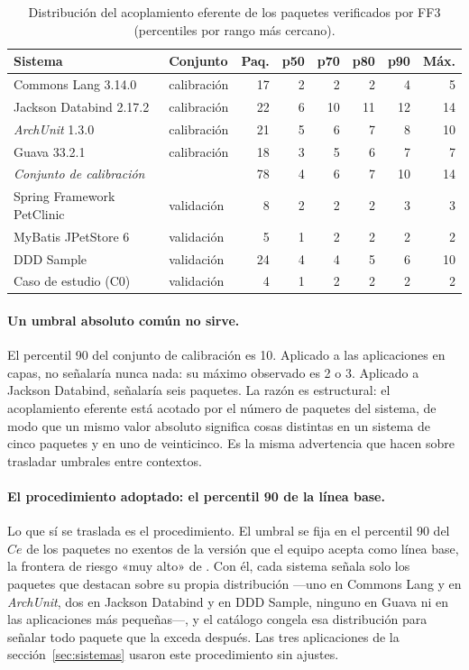 \begin{table}[H]
\centering
\caption{Distribución del acoplamiento eferente de los paquetes verificados por FF3 (percentiles por rango más cercano).}
\label{tab:umbral}
\footnotesize
\begin{tabular}{llrrrrrr}
\toprule
\textbf{Sistema} & \textbf{Conjunto} & \textbf{Paq.} & \textbf{p50} & \textbf{p70} & \textbf{p80} & \textbf{p90} & \textbf{Máx.} \\
\midrule
Commons Lang 3.14.0 & calibración & 17 & 2 & 2 & 2 & 4 & 5 \\
Jackson Databind 2.17.2 & calibración & 22 & 6 & 10 & 11 & 12 & 14 \\
\textit{ArchUnit} 1.3.0 & calibración & 21 & 5 & 6 & 7 & 8 & 10 \\
Guava 33.2.1 & calibración & 18 & 3 & 5 & 6 & 7 & 7 \\
\midrule
\textit{Conjunto de calibración} & & 78 & 4 & 6 & 7 & 10 & 14 \\
\midrule
Spring Framework PetClinic & validación & 8 & 2 & 2 & 2 & 3 & 3 \\
MyBatis JPetStore 6 & validación & 5 & 1 & 2 & 2 & 2 & 2 \\
DDD Sample & validación & 24 & 4 & 4 & 5 & 6 & 10 \\
Caso de estudio (C0) & validación & 4 & 1 & 2 & 2 & 2 & 2 \\
\bottomrule
\end{tabular}
\end{table}

\paragraph{Un umbral absoluto común no sirve.} El percentil 90 del conjunto de calibración es 10. Aplicado a las aplicaciones en capas, no señalaría nunca nada: su máximo observado es 2 o 3. Aplicado a Jackson Databind, señalaría seis paquetes. La razón es estructural: el acoplamiento eferente está acotado por el número de paquetes del sistema, de modo que un mismo valor absoluto significa cosas distintas en un sistema de cinco paquetes y en uno de veinticinco. Es la misma advertencia que \citet{LanzaMarinescu2006} hacen sobre trasladar umbrales entre contextos.

\paragraph{El procedimiento adoptado: el percentil 90 de la línea base.} Lo que sí se traslada es el procedimiento. El umbral se fija en el percentil 90 del $Ce$ de los paquetes no exentos de la versión que el equipo acepta como línea base, la frontera de riesgo «muy alto» de \citet{Alves2010}. Con él, cada sistema señala solo los paquetes que destacan sobre su propia distribución ---uno en Commons Lang y en \textit{ArchUnit}, dos en Jackson Databind y en DDD Sample, ninguno en Guava ni en las aplicaciones más pequeñas---, y el catálogo congela esa distribución para señalar todo paquete que la exceda después. Las tres aplicaciones de la sección~\ref{sec:sistemas} usaron este procedimiento sin ajustes.

